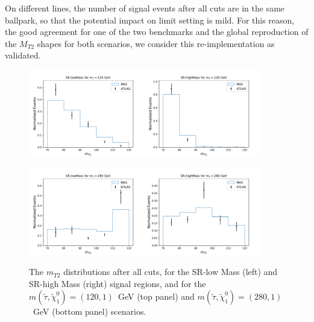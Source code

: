 \documentclass{ws-mpla}
\begin{document}
On different lines, the number of signal events after all cuts are in the same ballpark, so that the potential impact on limit setting is mild. For this reason, the good agreement for one of the two benchmarks and the global reproduction of the $M_{T2}$ shapes for both scenarios, we consider this re-implementation as validated.

\begin{figure}[t]
  \centerline{\includegraphics[width=2.0in]{m120_SRlow}\includegraphics[width=2.0in]{m120_SRhigh}}
  \vspace*{8pt}
  \centerline{\includegraphics[width=2.0in]{m280_SRlow}\includegraphics[width=2.0in]{m280_SRhigh}}
  \caption{The $m_{T2}$ distributions after all cuts, for the SR-low Mass (left) and SR-high Mass (right) signal regions, and for the $m(\tilde{\tau},\tilde{\chi}^0_1)=(120,1)$~GeV (top panel) and $m(\tilde{\tau},\tilde{\chi}^0_1)=(280,1)$~GeV (bottom panel) scenarios.\protect\label{fig:mt2}}
\end{figure}
\end{document}
